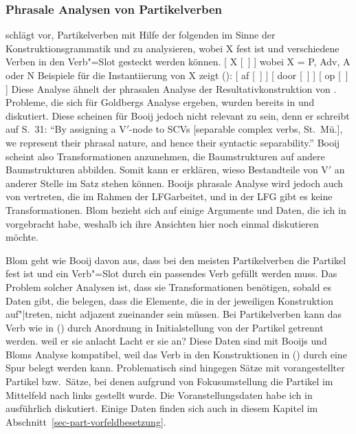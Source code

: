 \subsubsection{Phrasale Analysen von Partikelverben}
\label{sec-phrasal-pv}

\citet[Abschnitt~2]{Booij2002a} schlägt vor, Partikelverben mit Hilfe der folgenden \Konstruktion im
Sinne der Konstruktionsgrammatik und
\citet{Jackendoff97a}
zu analysieren, wobei X fest ist und verschiedene Verben in den
Verb"=Slot gesteckt werden können.
\ea
{}[ X [~] ] wobei X = P, Adv, A oder N
\z
Beispiele für die Instantiierung von X zeigt ():
\eal
\label{particle-konstruktionen}
\ex {}[ af   [~] ]
\ex {}[ door [~] ]
\ex {}[ op   [~] ]
\zl 
Diese Analyse ähnelt der phrasalen Analyse der Resultativkonstruktion von
\citet[Kapitel~8]{Goldberg95a}. Probleme, die sich für Goldbergs Analyse ergeben,
wurden bereits in  und 
diskutiert. Diese scheinen für Booij jedoch nicht relevant zu sein,
denn er schreibt auf S.~31: "`By assigning a V$'$\kern-1pt-node to SCVs [separable complex verbs, St.\ Mü.],
we represent their phrasal nature, and hence their syntactic separability."' Booij
scheint also Transformationen anzunehmen, die Baumstrukturen
auf andere Baumstrukturen abbilden. Somit kann er erklären, wieso Bestandteile
von V$'$ an anderer Stelle im Satz stehen können.
Booijs phrasale Analyse wird jedoch auch von \citet{Blom2005a} vertreten,
die im Rahmen der LFG\indexlfgstart arbeitet,
und in der LFG gibt es keine Transformationen. Blom bezieht sich auf einige Argumente und Daten, 
die ich in 
vorgebracht habe, weshalb ich ihre Ansichten hier noch einmal diskutieren möchte.

Blom geht wie Booij davon aus, dass bei den meisten Partikelverben die Partikel fest ist und 
ein Verb"=Slot durch ein passendes Verb gefüllt werden muss. Das Problem solcher Analysen ist,
dass sie Transformationen benötigen, sobald es Daten gibt, die belegen, dass die Elemente,
die in der jeweiligen Konstruktion auf"|treten, nicht adjazent zueinander sein müssen. Bei Partikelverben
kann das Verb wie in () durch Anordnung in Initialstellung von der Partikel getrennt werden.
\eal
\ex weil er sie anlacht
\ex Lacht er sie an?
\zl
Diese Daten sind mit Booijs und Bloms Analyse kompatibel, weil das Verb in den Konstruktionen
in () durch eine Spur belegt werden kann. Problematisch sind hingegen Sätze mit vorangestellter
Partikel bzw.\ Sätze, bei denen aufgrund von Fokusumstellung die Partikel im Mittelfeld nach
links gestellt wurde. Die Voranstellungsdaten habe ich in \parencites[Abschnitt~6.1.2]{Mueller2002b}[Abschnitt~3]{Mueller2002d} 
ausführlich diskutiert. Einige Daten finden sich auch in diesem Kapitel im Abschnitt~\ref{sec-part-vorfeldbesetzung}.

